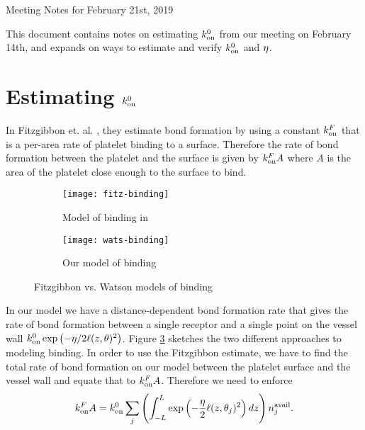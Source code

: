 \documentclass{article}
\newcommand{\tn}{\textnormal}
\begin{document}
\pagestyle{empty}




\begin{center}
{\Large Meeting Notes for February 21st, 2019}
\end{center}

This document contains notes on estimating $\onConst$ from our meeting
on February 14th, and expands on ways to estimate and verify
$\onConst$ and $\eta$.

\section{Estimating $\onConst$}
\label{sec:estimating-onconst}

In Fitzgibbon et. al. \cite{Fitzgibbon2014}, they estimate bond
formation by using a constant $k_\tn{on}^F$ that is a per-area rate
of platelet binding to a surface. Therefore the rate of bond
formation between the platelet and the surface is given by
$k_\tn{on}^F A$ where $A$ is the area of the platelet close enough to
the surface to bind.

\begin{figure}
  \centering
  \begin{subfigure}{0.48\textwidth}
    \texttt{[image: fitz-binding]}
    \caption{Model of binding in \cite{Fitzgibbon2014}}
    \label{fig:fitz-binding}
  \end{subfigure}
  \hfill
  \begin{subfigure}{0.48\textwidth}
    \texttt{[image: wats-binding]}
    \caption{Our model of binding}
    \label{fig:wats-binding}
  \end{subfigure}
  \caption{Fitzgibbon vs. Watson models of binding}
  \label{fig:binding}
\end{figure}

In our model we have a distance-dependent bond formation rate that
gives the rate of bond formation between a single receptor and a
single point on the vessel wall $\onConst \exp \left(-\eta/2 \ell(z,
  \theta)^2 \right)$. Figure \ref{fig:binding} sketches the two
different approaches to modeling binding. In order to use the
Fitzgibbon estimate, we have to find the total rate of bond formation
on our model between the platelet surface and the vessel wall and
equate that to $k_\tn{on}^F A$. Therefore we need to enforce
\begin{equation}
  \label{eq:fm-rate}
  k_\tn{on}^F A = \onConst \sum_j \left( \int_{-L}^{L} \exp
    \left(-\frac{\eta}{2} \ell(z, \theta_j)^2\right) dz \right)
  n_j^\tn{avail}.
\end{equation}
\end{document}
